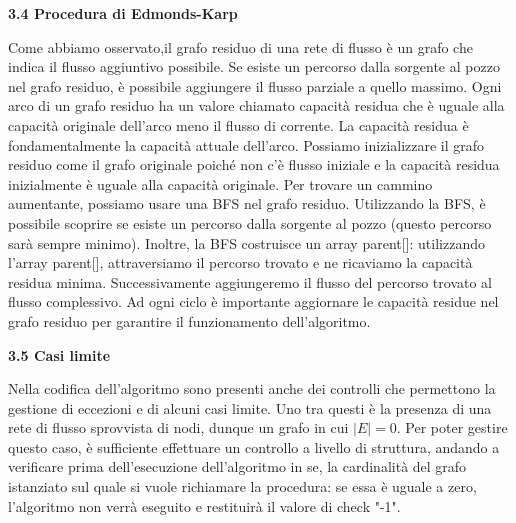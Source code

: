 \documentclass{article}
\begin{document}
\begin{flushleft}
\begin{Large}\textbf{3.4 Procedura di Edmonds-Karp}\end{Large}
\newline
\newline
Come abbiamo osservato,il grafo residuo di una rete di flusso è un grafo che indica il flusso aggiuntivo possibile. Se esiste un percorso dalla sorgente al pozzo nel grafo residuo, è possibile aggiungere il flusso parziale a quello massimo. Ogni arco di un grafo residuo ha un valore chiamato capacità residua che è uguale alla capacità originale dell'arco meno il flusso di corrente. La capacità residua è fondamentalmente la capacità attuale dell'arco.
\newline
Possiamo inizializzare il grafo residuo come il grafo originale poiché non c'è flusso iniziale e la capacità residua inizialmente è uguale alla capacità originale. Per trovare un cammino aumentante, possiamo usare una BFS nel grafo residuo. Utilizzando la BFS, è possibile scoprire se esiste un percorso dalla sorgente al pozzo (questo percorso sarà sempre minimo). Inoltre, la BFS costruisce un array parent[]: utilizzando l'array parent[], attraversiamo il percorso trovato e ne ricaviamo la capacità residua minima. Successivamente aggiungeremo il flusso del percorso trovato al flusso complessivo.
Ad ogni ciclo è importante aggiornare le capacità residue nel grafo residuo per garantire il funzionamento dell'algoritmo.
\newline
\newline
\newline
\begin{Large}\textbf{3.5 Casi limite}\end{Large}
\newline
\newline
Nella codifica dell'algoritmo sono presenti anche dei controlli che permettono la gestione di eccezioni e di alcuni casi limite. Uno tra questi è la presenza di una rete di flusso sprovvista di nodi, dunque un grafo in cui $|E| = 0$. Per poter gestire questo caso, è sufficiente effettuare un controllo a livello di struttura, andando a verificare prima dell'esecuzione dell'algoritmo in se, la cardinalità del grafo istanziato sul quale si vuole richiamare la procedura: se essa è uguale a zero, l'algoritmo non verrà eseguito e restituirà il valore di check "-1".
\newline
\vspace{100pt}
\newline


\end{flushleft}
\end{document}
